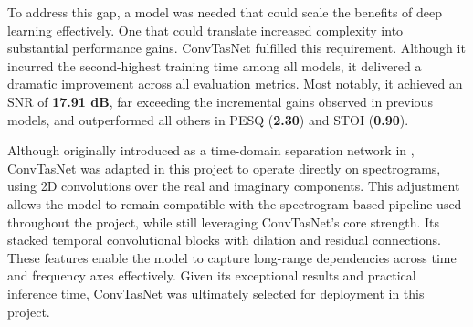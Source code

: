 To address this gap, a model was needed that could scale the benefits of deep learning effectively. One that could translate increased complexity into substantial performance gains. ConvTasNet fulfilled this requirement. Although it incurred the second-highest training time among all models, it delivered a dramatic improvement across all evaluation metrics. Most notably, it achieved an SNR of \textbf{17.91 dB}, far exceeding the incremental gains observed in previous models, and outperformed all others in PESQ (\textbf{2.30}) and STOI (\textbf{0.90}).

Although originally introduced as a time-domain separation network in \cite{Luo2018ConvTasNetSI}, ConvTasNet was adapted in this project to operate directly on spectrograms, using 2D convolutions over the real and imaginary components. This adjustment allows the model to remain compatible with the spectrogram-based pipeline used throughout the project, while still leveraging ConvTasNet’s core strength. Its stacked temporal convolutional blocks with dilation and residual connections. These features enable the model to capture long-range dependencies across time and frequency axes effectively. Given its exceptional results and practical inference time, ConvTasNet was ultimately selected for deployment in this project. 